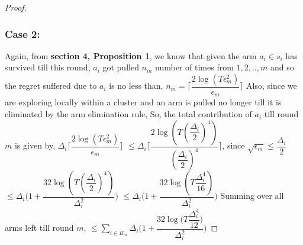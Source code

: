 \begin{proof}
\subsubsection{Case 2:}
Again, from \textbf{section 4, Proposition 1}, we know that given the arm $a_{i}\in s_{i}$ has survived till this round, $a_{i}$ got pulled $n_{m}$ number of times from $1,2,..,m$ and so the regret suffered due to $a_{i}$ is no less than,
\newline
\hspace*{4em}$n_{m}=\bigg\lceil\dfrac{2\log{(T\epsilon_{m}^{2})}}{\epsilon_{m}}\bigg\rceil$
\newline
Also, since we are exploring locally within a cluster and an arm is pulled no longer till it is eliminated by the arm elimination rule, 
So, the total contribution of $a_{i}$  till round $m$ is given by,
\newline
\hspace*{4em}$\Delta_{i}\bigg\lceil\dfrac{2\log{(T\epsilon_{m}^{2})}}{\epsilon_{m}}\bigg\rceil$
$\leq\Delta_{i}\bigg\lceil\dfrac{2\log{(T(\dfrac{\Delta_{i}}{2})^{4})}}{(\dfrac{\Delta_{i}}{2})^{4}}\bigg\rceil$, since $\sqrt{\epsilon_{m}}\leq\dfrac{\Delta_{i}}{2}$
\newline
\hspace*{14em}
$\leq\Delta_{i}\bigg(1+\dfrac{32\log{(T(\dfrac{\Delta_{i}}{2})^{4})}}{\Delta_{i}^{2}}\bigg)$
\newline
\hspace*{14em}
$\leq\Delta_{i}\bigg(1+\dfrac{32\log{(T\dfrac{\Delta_{i}^{4}}{16})}}{\Delta_{i}^{2}}\bigg)$
\newline
Summing over all arms left till round $m$,
\newline
\hspace*{4em}$\leq\sum_{i\in B_{m}}\Delta_{i}\bigg(1+\dfrac{32\log{(T\dfrac{\Delta_{i}^{4}}{12}})}{\Delta_{i}^{2}}\bigg)$
\newline

\end{proof}
